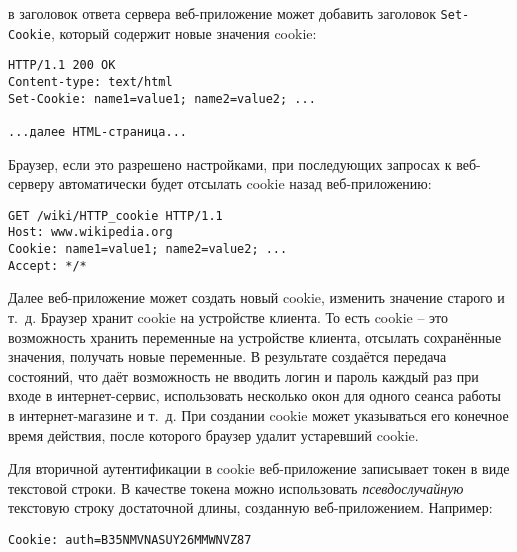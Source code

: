 в заголовок ответа сервера веб-приложение может добавить заголовок \texttt{Set-Cookie}, который содержит новые значения cookie:
\begin{center} \begin{verbatim}
HTTP/1.1 200 OK
Content-type: text/html
Set-Cookie: name1=value1; name2=value2; ...

...далее HTML-страница...
\end{verbatim} \end{center}

Браузер, если это разрешено настройками, при последующих запросах к веб-серверу автоматически будет отсылать cookie назад веб-приложению:
\begin{center} \begin{verbatim}
GET /wiki/HTTP_cookie HTTP/1.1
Host: www.wikipedia.org
Cookie: name1=value1; name2=value2; ...
Accept: */*
\end{verbatim} \end{center}

Далее веб-приложение может создать новый cookie, изменить значение старого и т.~д. Браузер хранит cookie на устройстве клиента. То есть cookie -- это возможность хранить переменные на устройстве клиента, отсылать сохранённые значения, получать новые переменные. В результате создаётся передача состояний, что даёт возможность не вводить логин и пароль каждый раз при входе в интернет-сервис, использовать несколько окон для одного сеанса работы в интернет-магазине и т.~д. При создании cookie может указываться его конечное время действия, после которого браузер удалит устаревший cookie.

Для вторичной аутентификации в cookie веб-приложение записывает токен в виде текстовой строки. В качестве токена можно использовать \emph{псевдослучайную} текстовую строку достаточной длины, созданную веб-приложением. Например:
\begin{center} \begin{verbatim}
Cookie: auth=B35NMVNASUY26MMWNVZ87
\end{verbatim} \end{center}


